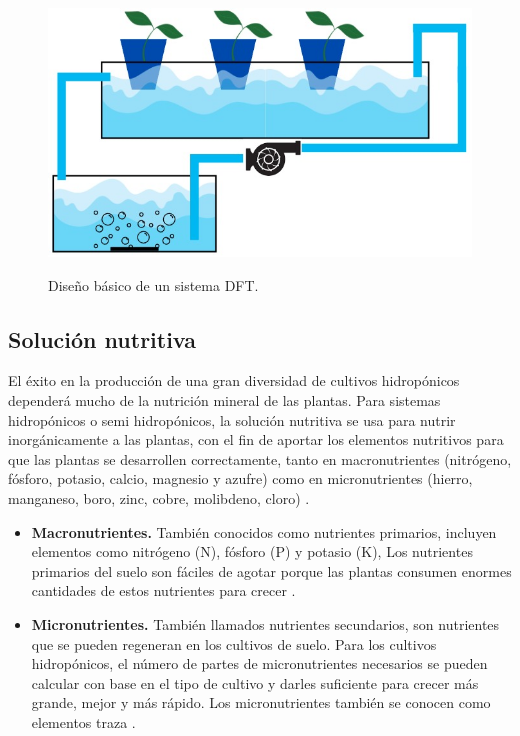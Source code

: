\begin{figure}[!ht]
\centering
         \includegraphics[scale=0.45]{imgs/dft.jpeg} \\
     \caption{Diseño básico de un sistema DFT.}\label{dft1}
\end{figure}

\subsection{Solución nutritiva}
El éxito en la producción de una gran diversidad de cultivos hidropónicos dependerá mucho de la nutrición mineral de las plantas. Para sistemas hidropónicos o semi hidropónicos, la solución nutritiva se usa para nutrir inorgánicamente a las plantas, con el fin de aportar los elementos nutritivos para que las plantas se desarrollen correctamente, tanto en macronutrientes (nitrógeno, fósforo, potasio, calcio, magnesio y azufre) como en micronutrientes (hierro, manganeso, boro, zinc, cobre, molibdeno, cloro) \cite{favela_2006}.
\begin{itemize}
\item \textbf{Macronutrientes.} También conocidos como nutrientes primarios, incluyen elementos como nitrógeno (N), fósforo (P) y potasio (K), Los nutrientes primarios del suelo son fáciles de agotar porque las plantas consumen enormes cantidades de estos nutrientes para crecer \cite{Meselmani22}.
\item \textbf{Micronutrientes.} También llamados nutrientes secundarios, son nutrientes que se pueden regeneran en los cultivos de suelo. Para los cultivos hidropónicos, el número de partes de micronutrientes necesarios se pueden calcular con base en el tipo de cultivo y darles suficiente para crecer más grande, mejor y más rápido. Los micronutrientes también se conocen como elementos traza \cite{Meselmani22}.
\end{itemize}

